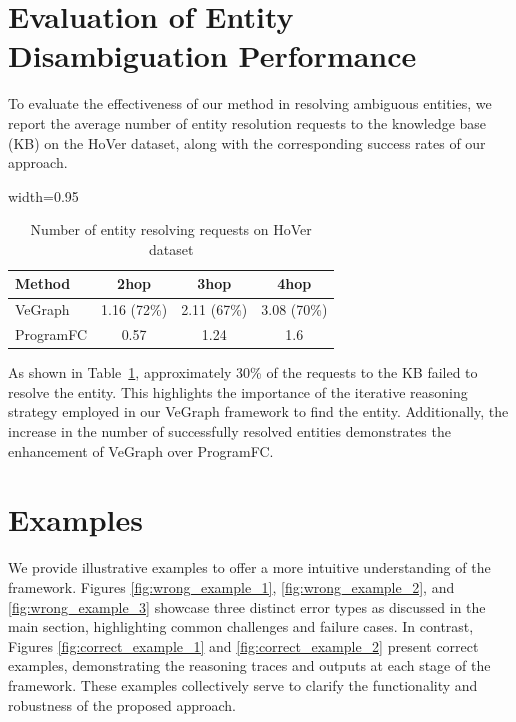 \documentclass[11pt]{article}
\begin{document}
\section{Evaluation of Entity Disambiguation Performance}
To evaluate the effectiveness of our method in resolving ambiguous entities, we report the average number of entity resolution requests to the knowledge base (KB) on the HoVer dataset, along with the corresponding success rates of our approach.
\begin{table}[!h]
\centering
\begin{adjustbox}{width=0.95\columnwidth}
\begin{tabular}{lccc}
\hline
\hline
\textbf{Method} & \textbf{2hop} & \textbf{3hop} & \textbf{4hop} \\ \hline
VeGraph   & 1.16 (72\%) & 2.11 (67\%) & 3.08 (70\%) \\
ProgramFC & 0.57        & 1.24        & 1.6         \\ \hline
\hline
\end{tabular}
\end{adjustbox}
\caption{Number of entity resolving requests on HoVer dataset}
\label{tab:entity_resolution_performance}
\end{table}

As shown in Table~\ref{tab:entity_resolution_performance}, approximately 30\% of the requests to the KB failed to resolve the entity. This highlights the importance of the iterative reasoning strategy employed in our VeGraph framework to find the entity. Additionally, the increase in the number of successfully resolved entities demonstrates the enhancement of VeGraph over ProgramFC.

\section{Examples}
We provide illustrative examples to offer a more intuitive understanding of the framework. Figures \ref{fig:wrong_example_1}, \ref{fig:wrong_example_2}, and \ref{fig:wrong_example_3} showcase three distinct error types as discussed in the main section, highlighting common challenges and failure cases. In contrast, Figures \ref{fig:correct_example_1} and \ref{fig:correct_example_2} present correct examples, demonstrating the reasoning traces and outputs at each stage of the framework. These examples collectively serve to clarify the functionality and robustness of the proposed approach.
\end{document}
